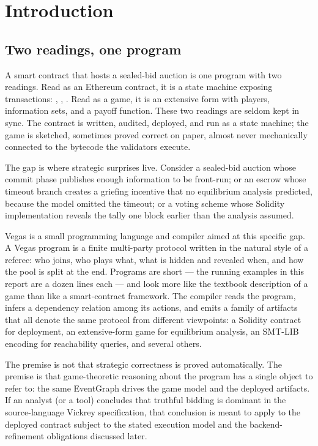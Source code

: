 \section{Introduction}
\label{sec:introduction}

\subsection{Two readings, one program}

A smart contract that hosts a sealed-bid auction is one program with
two readings.  Read as an Ethereum contract, it is a state machine
exposing transactions: ,
, .  Read as a game, it is an
extensive form with players, information sets, and a payoff
function.  These two readings are seldom kept in sync.  The
contract is written, audited, deployed, and run as a state
machine; the game is sketched, sometimes proved correct on paper,
almost never mechanically connected to the bytecode the validators
execute.

The gap is where strategic surprises live.  Consider a
sealed-bid auction whose commit phase publishes enough
information to be front-run; or an escrow whose timeout branch
creates a griefing incentive that no equilibrium analysis
predicted, because the model omitted the timeout; or a voting
scheme whose Solidity implementation reveals the tally one
block earlier than the analysis assumed.

Vegas is a small programming language and compiler aimed at this
specific gap.  A Vegas program is a finite multi-party protocol
written in the natural style of a referee: who joins, who plays
what, what is hidden and revealed when, and how the pool is split
at the end.  Programs are short --- the running examples in this
report are a dozen lines each --- and look more like the textbook
description of a game than like a smart-contract framework.  The
compiler reads the program, infers a dependency relation among
its actions, and emits a family of artifacts that all denote the
same protocol from different viewpoints: a Solidity contract for
deployment, an extensive-form game for equilibrium analysis, an
SMT-LIB encoding for reachability queries, and several others.

The premise is not that strategic correctness is proved
automatically.  The premise is that game-theoretic reasoning
about the program has a single object to refer to: the same
EventGraph drives the game model and the deployed artifacts.
If an analyst (or a tool) concludes that truthful bidding is
dominant in the source-language Vickrey specification, that
conclusion is meant to apply to the deployed contract subject
to the stated execution model and the backend-refinement
obligations discussed later.

